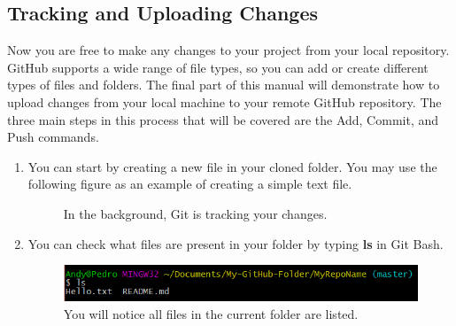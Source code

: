 \documentclass[12pt]{article}
\begin{document}
\subsection{Tracking and Uploading Changes}
Now you are free to make any changes to your project from your local repository. GitHub supports a wide range of file types, so you can add or create different types of files and folders. The final part of this manual will demonstrate how to upload changes from your local machine to your remote GitHub repository. The three main steps in this process that will be covered are the Add, Commit, and Push commands. 
\begin{enumerate}
    \item You can start by creating a new file in your cloned folder. You may use the following figure as an example of creating a simple text file.
    \begin{figure}[h!]
        \centering
        \qquad
        \caption{In the background, Git is tracking your changes.}
    \end{figure}
    \item You can check what files are present in your folder by typing \textbf{ls} in Git Bash.
        \begin{figure}[h!]
            \includegraphics[width=12cm, center]{Git-ls}
            \caption{You will notice all files in the current folder are listed.}
        \end{figure}

\end{enumerate}
\end{document}

